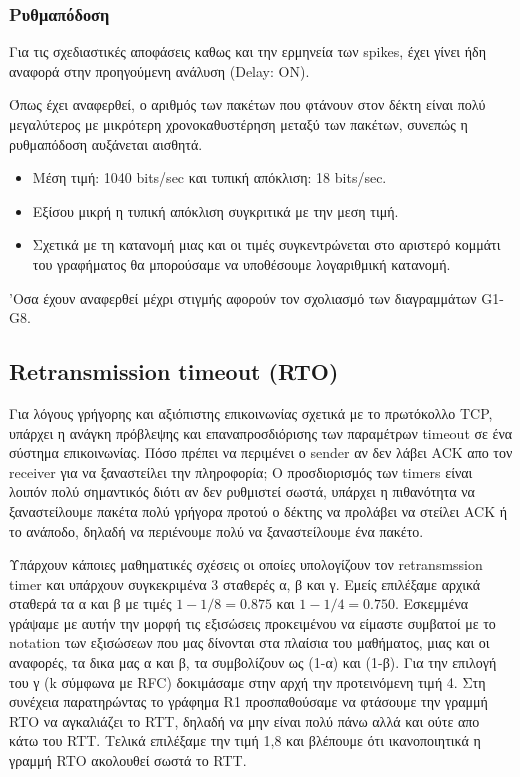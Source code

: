 \documentclass[hidelinks, 12pt, a4paper]{article}
\begin{document}
\subsubsection{Ρυθμαπόδοση}
Για τις σχεδιαστικές αποφάσεις καθως και την ερμηνεία των spikes, έχει γίνει ήδη αναφορά στην προηγούμενη ανάλυση (Delay: ON).

Όπως έχει αναφερθεί, ο αριθμός των πακέτων που φτάνουν στον δέκτη είναι πολύ μεγαλύτερος με μικρότερη χρονοκαθυστέρηση μεταξύ των πακέτων, συνεπώς η ρυθμαπόδοση αυξάνεται αισθητά.
\begin{itemize}
    \item Μέση τιμή: 1040 bits/sec και τυπική απόκλιση: 18 bits/sec.
    \item Εξίσου μικρή η τυπική απόκλιση συγκριτικά με την μεση τιμή.
    \item Σχετικά με τη κατανομή μιας και οι τιμές συγκεντρώνεται στο αριστερό κομμάτι του γραφήματος θα μπορούσαμε να υποθέσουμε λογαριθμική κατανομή.
\end{itemize}


'Οσα έχουν αναφερθεί μέχρι στιγμής αφορούν τον σχολιασμό των διαγραμμάτων G1-G8.

\subsection{Retransmission timeout (RTO)}


Για λόγους γρήγορης και αξιόπιστης επικοινωνίας σχετικά με το πρωτόκολλο TCP, υπάρχει η ανάγκη πρόβλεψης και επαναπροσδιόρισης των παραμέτρων timeout σε ένα σύστημα επικοινωνίας. Πόσο πρέπει να περιμένει ο sender αν δεν λάβει  ACK απο τον receiver για να ξαναστείλει την πληροφορία; Ο προσδιορισμός των timers είναι λοιπόν πολύ σημαντικός διότι αν δεν ρυθμιστεί σωστά, υπάρχει η πιθανότητα να ξαναστείλουμε πακέτα πολύ γρήγορα προτού ο δέκτης να προλάβει να στείλει ACΚ ή το ανάποδο, δηλαδή να περιένουμε πολύ να ξαναστείλουμε ένα πακέτο\cite{gfg_rto, saminir}. 

Υπάρχουν κάποιες μαθηματικές σχέσεις οι οποίες υπολογίζουν τον retransmssion timer και υπάρχουν συγκεκριμένα 3 σταθερές α, β και γ. Εμείς επιλέξαμε αρχικά σταθερά τα α και β με τιμές $1 - 1/8 = 0.875$ και $1 - 1/4 = 0.750$. Εσκεμμένα γράψαμε με αυτήν την μορφή τις εξισώσεις προκειμένου να είμαστε συμβατοί με το notation των εξισώσεων που μας δίνονται στα πλαίσια του μαθήματος, μιας και οι αναφορές\cite{rfc}, τα δικα μας α και β, τα συμβολίζουν ως (1-α) και (1-β). Για την επιλογή του γ (k σύμφωνα με RFC) δοκιμάσαμε στην αρχή την προτεινόμενη τιμή 4. Στη συνέχεια παρατηρώντας το γράφημα R1 προσπαθούσαμε να φτάσουμε την γραμμή RTO να αγκαλιάζει το RTT, δηλαδή να μην είναι πολύ πάνω αλλά και ούτε απο κάτω του RTT. Τελικά επιλέξαμε την τιμή 1,8 και βλέπουμε ότι ικανοποιητικά η γραμμή RTO ακολουθεί σωστά το RTT.
\end{document}

